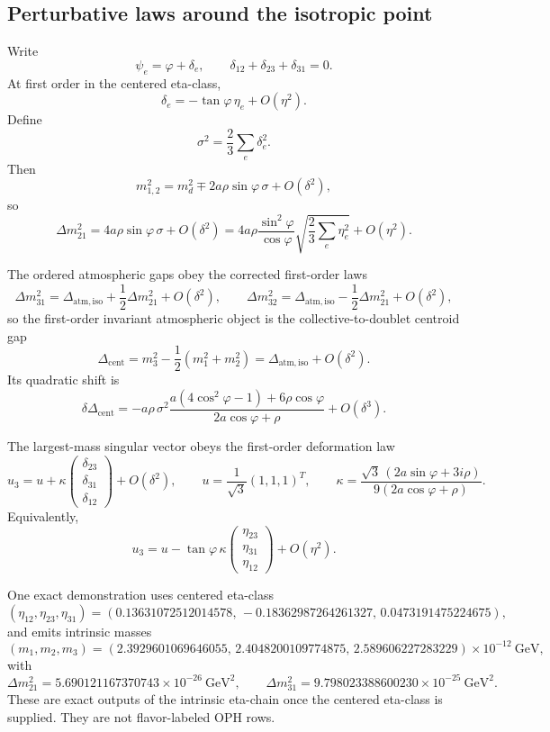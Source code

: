 \documentclass[11pt]{article}
\begin{document}
\subsection{Perturbative laws around the isotropic point}

Write
\[
\psi_e=\varphi+\delta_e,
\qquad
\delta_{12}+\delta_{23}+\delta_{31}=0.
\]
At first order in the centered eta-class,
\[
\delta_e=-\tan\varphi\,\eta_e+O(\eta^2).
\]
Define
\[
\sigma^2=\frac23\sum_e \delta_e^2.
\]
Then
\[
m_{1,2}^2=m_d^2\mp 2a\rho\sin\varphi\,\sigma+O(\delta^2),
\]
so
\[
\Delta m_{21}^2 = 4a\rho\sin\varphi\,\sigma+O(\delta^2)
=4a\rho\frac{\sin^2\varphi}{\cos\varphi}
\sqrt{\frac23\sum_e\eta_e^2}+O(\eta^2).
\]

The ordered atmospheric gaps obey the corrected first-order laws
\[
\Delta m_{31}^2 = \Delta_{\mathrm{atm,iso}} + \frac12\Delta m_{21}^2 + O(\delta^2),
\qquad
\Delta m_{32}^2 = \Delta_{\mathrm{atm,iso}} - \frac12\Delta m_{21}^2 + O(\delta^2),
\]
so the first-order invariant atmospheric object is the collective-to-doublet centroid gap
\[
\Delta_{\mathrm{cent}}=
m_3^2-\frac12(m_1^2+m_2^2)
=
\Delta_{\mathrm{atm,iso}}+O(\delta^2).
\]
Its quadratic shift is
\[
\delta\Delta_{\mathrm{cent}}
=
-
a\rho\,\sigma^2
\frac{a(4\cos^2\varphi-1)+6\rho\cos\varphi}
 {2a\cos\varphi+\rho}
+O(\delta^3).
\]

The largest-mass singular vector obeys the first-order deformation law
\[
u_3=
u+
\kappa
\begin{pmatrix}
\delta_{23}\\
\delta_{31}\\
\delta_{12}
\end{pmatrix}
+O(\delta^2),
\qquad
u=\frac1{\sqrt3}(1,1,1)^T,
\qquad
\kappa=
\frac{\sqrt3\,(2a\sin\varphi+3i\rho)}
 {9(2a\cos\varphi+\rho)}.
\]
Equivalently,
\[
u_3=
u-
\tan\varphi\,\kappa
\begin{pmatrix}
\eta_{23}\\
\eta_{31}\\
\eta_{12}
\end{pmatrix}
+O(\eta^2).
\]

One exact demonstration uses centered eta-class
\[
(\eta_{12},\eta_{23},\eta_{31})
=
(0.13631072512014578,\,-0.18362987264261327,\,0.0473191475224675),
\]
and emits intrinsic masses
\[
(m_1,m_2,m_3)=
(2.3929601069646055,\,
2.4048200109774875,\,
2.589606227283229)\times10^{-12}\ \mathrm{GeV},
\]
with
\[
\Delta m_{21}^2 = 5.690121167370743\times10^{-26}\ \mathrm{GeV}^2,
\qquad
\Delta m_{31}^2 = 9.798023388600230\times10^{-25}\ \mathrm{GeV}^2.
\]
These are exact outputs of the intrinsic eta-chain once the centered eta-class is supplied. They
are not flavor-labeled OPH rows.
\end{document}
